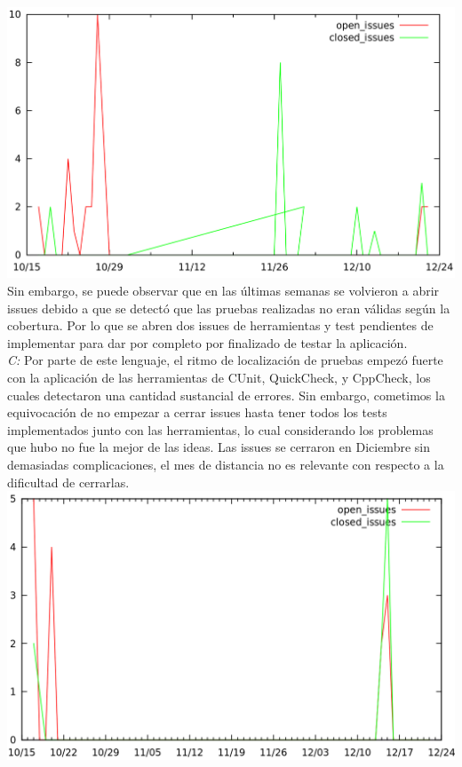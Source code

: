 \documentclass[DIV=calc,paper=a4,fontsize=11pt,onecolumn]{scrartcl} %
\begin{document}
  	\includegraphics[width=15cm]{Imagenes/issues.png} \\
  	
  	Sin embargo, se puede observar que en las últimas semanas se volvieron a abrir issues debido a que se detectó que las pruebas realizadas no eran válidas según la cobertura. Por lo que se abren dos issues de herramientas y test pendientes de implementar para dar por completo por finalizado de testar la aplicación. \\
  	
  	\textit{C:} Por parte de este lenguaje, el ritmo de localización de pruebas empezó fuerte con la aplicación de las herramientas de CUnit, QuickCheck, y CppCheck, los cuales detectaron una cantidad sustancial de errores. Sin embargo, cometimos la equivocación de no empezar a cerrar issues hasta tener todos los tests implementados junto con las herramientas, lo cual considerando los problemas que hubo no fue la mejor de las ideas. Las issues se cerraron en Diciembre sin demasiadas complicaciones, el mes de distancia no es relevante con respecto a la dificultad de cerrarlas. \\ 
  	
  	\includegraphics[width=15cm]{Imagenes/GraficoIssuesC.png} \\
  		
\end{document}
